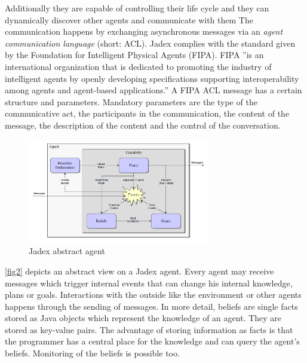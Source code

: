 Additionally they are capable of controlling their life cycle and they can dynamically discover other agents and communicate with them
The communication happens by exchanging asynchronous messages via an \emph{agent communication language} (short: ACL). Jadex complies with the standard given by the Foundation for Intelligent Physical Agents (FIPA). FIPA ''is an international organization that is dedicated to promoting the industry of intelligent agents by openly developing specifications supporting interoperability among agents and agent-based applications.''\cite{FIPA} A FIPA ACL message has a certain structure and parameters. Mandatory parameters are the type of the communicative act, the participants in the communication, the content of the message, the description of the content and the control of the conversation. %

\begin{figure}
	\centering
	\includegraphics[width=300px]{images/Jadex_agent.png}
	\caption{Jadex abstract agent \cite{pokahr_jadex_2005}}
	\label{fig2}
\end{figure}
\autoref{fig2} depicts an abstract view on a Jadex agent. Every agent may receive messages which trigger internal events that can change his internal knowledge, plans or goals. Interactions with the outside like the environment or other agents happens through the sending of messages. %
In more detail, beliefs are single facts stored as Java objects which represent the knowledge of an agent. %
They are stored as key-value pairs.
The advantage of storing information as facts is that the programmer has a central place for the knowledge and can query the agent's beliefs. %
Monitoring of the beliefs is possible too.

